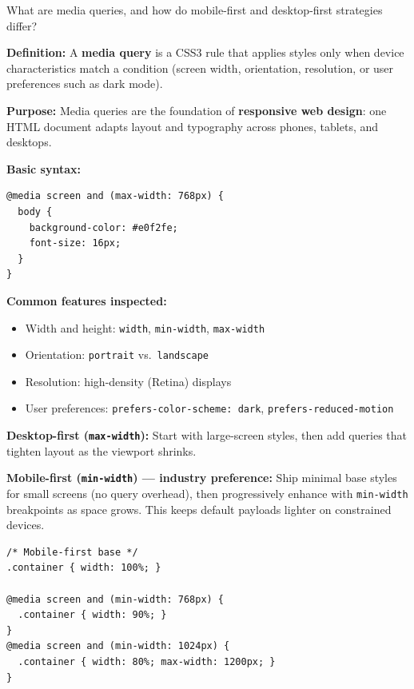 \question[4]
What are media queries, and how do mobile-first and desktop-first strategies differ?
\begin{solutionorbox}[3.75in]
\textbf{Definition:} A \textbf{media query} is a CSS3 rule that applies styles only when device characteristics match a condition (screen width, orientation, resolution, or user preferences such as dark mode).

\textbf{Purpose:} Media queries are the foundation of \textbf{responsive web design}: one HTML document adapts layout and typography across phones, tablets, and desktops.

\textbf{Basic syntax:}
\begin{lstlisting}[style=css]
@media screen and (max-width: 768px) {
  body {
    background-color: #e0f2fe;
    font-size: 16px;
  }
}
\end{lstlisting}

\textbf{Common features inspected:}
\begin{itemize}
  \item Width and height: \lstinline[style=cssinline]|width|, \lstinline[style=cssinline]|min-width|, \lstinline[style=cssinline]|max-width|
  \item Orientation: \lstinline[style=cssinline]|portrait| vs.\ \lstinline[style=cssinline]|landscape|
  \item Resolution: high-density (Retina) displays
  \item User preferences: \lstinline[style=cssinline]|prefers-color-scheme: dark|, \lstinline[style=cssinline]|prefers-reduced-motion|
\end{itemize}

\textbf{Desktop-first (\lstinline[style=cssinline]|max-width|):} Start with large-screen styles, then add queries that tighten layout as the viewport shrinks.

\textbf{Mobile-first (\lstinline[style=cssinline]|min-width|) --- industry preference:} Ship minimal base styles for small screens (no query overhead), then progressively enhance with \lstinline[style=cssinline]|min-width| breakpoints as space grows. This keeps default payloads lighter on constrained devices.

\begin{lstlisting}[style=css]
/* Mobile-first base */
.container { width: 100%; }

@media screen and (min-width: 768px) {
  .container { width: 90%; }
}
@media screen and (min-width: 1024px) {
  .container { width: 80%; max-width: 1200px; }
}
\end{lstlisting}
\end{solutionorbox}

